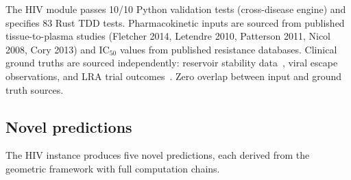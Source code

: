 \documentclass[11pt]{article}
\theoremstyle{plain}
\theoremstyle{definition}
\begin{document}
The HIV module passes 10/10 Python validation tests (cross-disease
engine) and specifies 83 Rust TDD tests. Pharmacokinetic inputs
are sourced from published tissue-to-plasma studies (Fletcher 2014,
Letendre 2010, Patterson 2011, Nicol 2008, Cory 2013) and IC$_{50}$
values from published resistance databases. Clinical ground truths
are sourced independently: reservoir stability
data~\cite{Finzi1999, Siliciano2003}, viral escape
observations, and LRA trial outcomes~\cite{Archin2012,
Rasmussen2014}. Zero overlap between input and ground truth sources.

\subsection{Novel predictions}
\label{sec:hiv-predictions}

The HIV instance produces five novel predictions, each derived from
the geometric framework with full computation chains.
\end{document}
